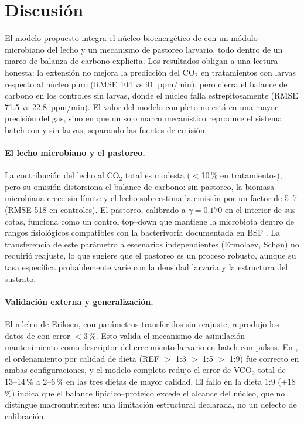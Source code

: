 \section{Discusi\'{o}n}
\label{sec:discusion}

El modelo propuesto integra el n\'{u}cleo bioenerg\'{e}tico de
\parencite{eriksen2022} con un m\'{o}dulo microbiano del lecho y un
mecanismo de pastoreo larvario, todo dentro de un marco de balanza de
carbono expl\'{i}cita. Los resultados obligan a una lectura honesta:
la extensi\'{o}n no mejora la predicci\'{o}n del CO$_2$ en tratamientos
con larvas respecto al n\'{u}cleo puro (RMSE 104 vs 91~ppm/min), pero
cierra el balance de carbono en los controles sin larvas, donde el
n\'{u}cleo falla estrepitosamente (RMSE 71.5 vs 22.8~ppm/min). El
valor del modelo completo no est\'{a} en una mayor precisi\'{o}n del
gas, sino en que un solo marco mecan\'{i}stico reproduce el sistema
batch con y sin larvas, separando las fuentes de emisi\'{o}n.

\paragraph{El lecho microbiano y el pastoreo.}
La contribuci\'{o}n del lecho al CO$_2$ total es modesta ($<$10\,\% en
tratamientos), pero su omisi\'{o}n distorsiona el balance de carbono:
sin pastoreo, la biomasa microbiana crece sin l\'{i}mite y el lecho
sobreestima la emisi\'{o}n por un factor de 5--7 (RMSE 518 en
controles). El pastoreo, calibrado a $\gamma=0.170$ en el interior de
sus cotas, funciona como un control top--down que mantiene la
microbiota dentro de rangos fisiol\'{o}gicos compatibles con la
bacterivor\'{i}a documentada en BSF
\parencite{klammsteinerCoreGutMicrobiome2020,%
brunoIntestinalMicrobiotaHermetia2019,%
douilletCarbonContributionBacterivory1993}. La transferencia de este
par\'{a}metro a escenarios independientes (Ermolaev, Sch{\o}n) no
requiri\'{o} reajuste, lo que sugiere que el pastoreo es un proceso
robusto, aunque su tasa espec\'{i}fica probablemente var\'{i}e con la
densidad larvaria y la estructura del sustrato.

\paragraph{Validaci\'{o}n externa y generalizaci\'{o}n.}
El n\'{u}cleo de Eriksen, con par\'{a}metros transferidos sin
reajuste, reprodujo los datos de \parencite{ermolaevGreenhouseGasEmissions2019}
con error $<$3\,\%. Esto valida el mecanismo de asimilaci\'{o}n--mantenimiento
como descriptor del crecimiento larvario en batch con pulsos. En
\parencite{schonUsingGasExchange2026}, el ordenamiento por calidad de dieta
(REF $>$ 1:3 $>$ 1:5 $>$ 1:9) fue correcto en ambas configuraciones,
y el modelo completo redujo el error de VCO$_2$ total de 13--14\,\% a
2--6\,\% en las tres dietas de mayor calidad. El fallo en la dieta
1:9 (+18\,\%) indica que el balance lip\'{i}dico--proteico excede el
alcance del n\'{u}cleo, que no distingue macronutrientes: una
limitaci\'{o}n estructural declarada, no un defecto de calibraci\'{o}n.

